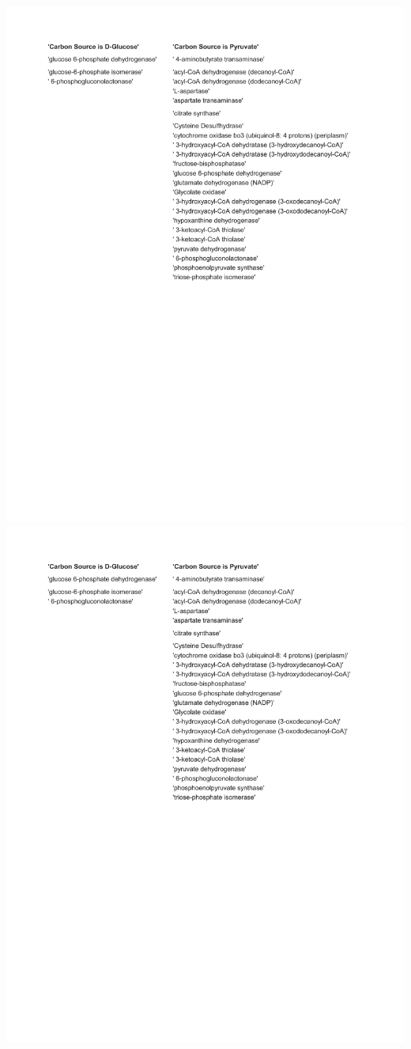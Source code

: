 \documentclass[12pt]{article}
\begin{document}
\includegraphics[page=2]{Figures/SuppInfo/CarbonSources.pdf}
\newpage
\includegraphics[page=3]{Figures/SuppInfo/CarbonSources.pdf}
\end{document}
